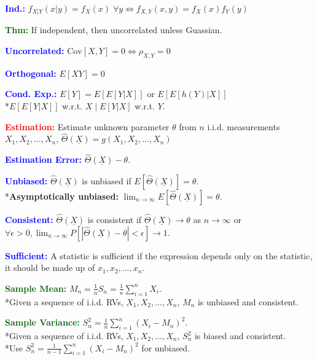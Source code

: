 \documentclass[5pt]{extarticle} %
\begin{document}
\begin{paracol}{3}
{    \textcolor{blue}{\textbf{Ind.:}} $f_{X|Y}(x|y) = f_X(x) \; \forall y \Leftrightarrow f_{X,Y}(x, y) = f_X(x) f_Y(y) $ 
    
    \textcolor{darkgreen}{\textbf{Thm:}} If independent, then uncorrelated unless Guassian.

    \textcolor{blue}{\textbf{Uncorrelated:}} $\text{Cov}[X, Y] = 0 \Leftrightarrow \rho_{X,Y} = 0$

    \textcolor{blue}{\textbf{Orthogonal:}} $E[XY] = 0$

    \textcolor{blue}{\textbf{Cond. Exp.:}} $E[Y] = E[E[Y|X]]$ or $E[E[h(Y)|X]]$ \\
    *$E[E[Y|X]]$ w.r.t. $X \mid E[Y|X]$ w.r.t. $Y$. 

    \textcolor{red}{\textbf{Estimation:}} Estimate unknown parameter $\theta$ from $n$ i.i.d. measurements $X_1, X_2, \ldots, X_n$, $\hat{\Theta}(\underline{X}) = g(X_1, X_2, \ldots, X_n)$

    \textcolor{blue}{\textbf{Estimation Error:}} $\hat{\Theta}(\underline{X}) - \theta$. 

    \textcolor{blue}{\textbf{Unbiased:}} $\hat{\Theta}(\underline{X})$ is unbiased if $E[\hat{\Theta}(\underline{X})] = \theta$. \\
    *\textbf{Asymptotically unbiased:} $\lim_{n \to \infty} E[\hat{\Theta}(\underline{X})] = \theta$.

    \textcolor{blue}{\textbf{Consistent:}} $\hat{\Theta}(\underline{X})$ is consistent if $\hat{\Theta}(\underline{X}) \rightarrow \theta$ as $n \to \infty$ or $\forall \epsilon >0, \lim_{n \to \infty} P[|\hat{\Theta}(\underline{X}) - \theta| < \epsilon] \rightarrow 1$.

    \textcolor{blue}{\textbf{Sufficient:}} A statistic is sufficient if the expression depends only on the statistic, it should be made up of $x_1, x_2, \ldots, x_n$.

    \textcolor{darkgreen}{\textbf{Sample Mean:}} $M_n = \frac{1}{n} S_n = \frac{1}{n} \sum_{i=1}^n X_i$. \\
    *Given a sequence of i.i.d. RVs, $X_1, X_2, \ldots, X_n$, $M_n$ is unbiased and consistent.

    \textcolor{darkgreen}{\textbf{Sample Variance:}} $S_n^2 = \frac{1}{n} \sum_{i=1}^n (X_i - M_n)^2$. \\
    *Given a sequence of i.i.d. RVs, $X_1, X_2, \ldots, X_n$, $S_n^2$ is biased and consistent. \\
    *Use $S_n^2 = \frac{1}{n-1} \sum_{i=1}^n (X_i - M_n)^2$ for unbiased.

}
\end{paracol}
\end{document}
